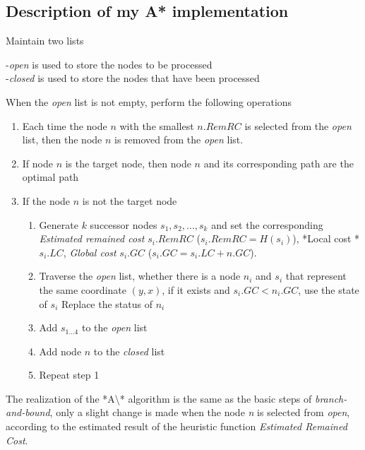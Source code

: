 \documentclass[
]{article}
\begin{document}
\hypertarget{header-n33}{%
\subsection{Description of my A* implementation}\label{header-n33}}

Maintain two lists

-\emph{open} is used to store the nodes to be processed\\
-\emph{closed} is used to store the nodes that have been processed

When the \emph{open} list is not empty, perform the following operations

\begin{enumerate}
\def\labelenumi{\arabic{enumi}.}
\item
  Each time the node \(n\) with the smallest \(n.RemRC\) is selected
  from the \emph{open} list, then the node \(n\) is removed from the
  \emph{open} list.
\item
  If node \(n\) is the target node, then node \(n\) and its
  corresponding path are the optimal path
\item
  If the node \(n\) is not the target node

  \begin{enumerate}
  \def\labelenumii{\arabic{enumii}.}
  \item
    Generate \(k\) successor nodes \(s_1, s_2, ..., s_k\) and set the
    corresponding \emph{Estimated remained cost} \(s_i.RemRC\)
    (\(s_i.RemRC = H(s_i)\)), *Local cost * \(s_i.LC\), \emph{Global
    cost} \(s_i.GC\) (\(s_i.GC = s_i.LC + n.GC\)).
  \item
    Traverse the \emph{open} list, whether there is a node \(n_i\) and
    \(s_i\) that represent the same coordinate \((y, x)\), if it exists
    and \(s_i.GC <n_i.GC\), use the state of \(s_i\) Replace the status
    of \(n_i\)
  \item
    Add \(s_{1...4}\) to the \emph{open} list
  \item
    Add node \(n\) to the \emph{closed} list
  \item
    Repeat step 1
  \end{enumerate}
\end{enumerate}

The realization of the *A\textbackslash** algorithm is the same as the
basic steps of \emph{branch-and-bound}, only a slight change is made
when the node \emph{n} is selected from \emph{open}, according to the
estimated result of the heuristic function \emph{Estimated Remained
Cost}.
\end{document}
